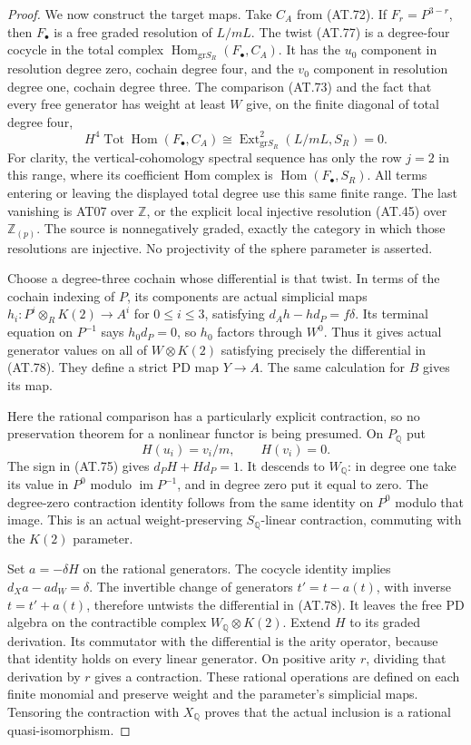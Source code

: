 \begin{proof}
We now construct the target maps.
Take $C_A$ from \textup{(AT.72)}.
If $F_r=P^{3-r}$, then $F_\bullet$ is a free
graded resolution of $L/mL$.
The twist \textup{(AT.77)} is a degree-four
cocycle in the total complex
$\operatorname{Hom}_{\mathrm{gr}S_R}(F_\bullet,C_A)$.
It has the $u_0$ component in resolution degree
zero, cochain degree four, and the $v_0$ component
in resolution degree one, cochain degree three.
The comparison \textup{(AT.73)} and the fact
that every free generator has weight at least $W$
give, on the finite diagonal of total degree four,
\[
 H^4\operatorname{Tot}\operatorname{Hom}(F_\bullet,C_A)
       \cong
 \operatorname{Ext}^2_{\mathrm{gr}S_R}(L/mL,S_R)=0.
 \tag{AT.79}
\]
For clarity, the vertical-cohomology spectral sequence
has only the row $j=2$ in this range, where its
coefficient Hom complex is
$\operatorname{Hom}(F_\bullet,S_R)$.
All terms entering or leaving the displayed total
degree use this same finite range.
The last vanishing is AT07 over $\mathbb Z$,
or the explicit local injective resolution
\textup{(AT.45)} over $\mathbb Z_{(p)}$.
The source is nonnegatively graded, exactly the
category in which those resolutions are injective.
No projectivity of the sphere parameter is asserted.

Choose a degree-three cochain whose differential
is that twist. In terms of the cochain indexing
of $P$, its components are actual simplicial maps
$h_i:P^i\otimes_R K(2)\to A^i$ for $0\leq i\leq3$,
satisfying
$d_Ah-hd_P=f\delta$.
Its terminal equation on $P^{-1}$ says
$h_0d_P=0$, so $h_0$ factors through $W^0$.
Thus it gives actual generator values on all
of $W\otimes K(2)$ satisfying precisely the
differential in \textup{(AT.78)}.
They define a strict PD map $Y\to A$.
The same calculation for $B$ gives its map.

Here the rational comparison has a particularly
explicit contraction, so no preservation theorem
for a nonlinear functor is being presumed.
On $P_{\mathbb Q}$ put
\[
                   H(u_i)=v_i/m,\qquad H(v_i)=0.
 \tag{AT.80}
\]
The sign in \textup{(AT.75)} gives
$d_PH+Hd_P=1$.
It descends to $W_{\mathbb Q}$: in degree one
take its value in $P^0$ modulo $\operatorname{im}P^{-1}$,
and in degree zero put it equal to zero.
The degree-zero contraction identity follows
from the same identity on $P^0$ modulo that image.
This is an actual weight-preserving $S_{\mathbb Q}$-linear
contraction, commuting with the $K(2)$ parameter.

Set $a=-\delta H$ on the rational generators.
The cocycle identity implies
$d_Xa-ad_W=\delta$.
The invertible change of generators $t'=t-a(t)$,
with inverse $t=t'+a(t)$, therefore untwists the
differential in \textup{(AT.78)}.
It leaves the free PD algebra on the contractible
complex $W_{\mathbb Q}\otimes K(2)$.
Extend $H$ to its graded derivation.
Its commutator with the differential is the
arity operator, because that identity holds on
every linear generator.
On positive arity $r$, dividing that derivation
by $r$ gives a contraction. These rational
operations are defined on each finite monomial
and preserve weight and the parameter's simplicial
maps. Tensoring the contraction with $X_{\mathbb Q}$
proves that the actual inclusion is a rational
quasi-isomorphism.


\end{proof}

